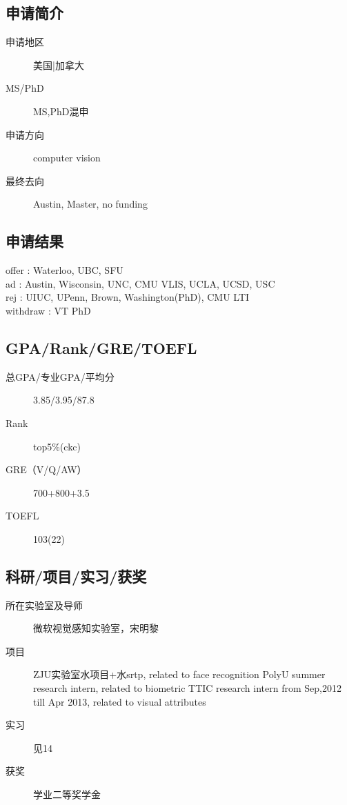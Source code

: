 \documentclass[11pt,fleqn,openany]{book} %
\begin{document}
\noindent\begin{minipage}[t]{0.45\textwidth}
\subsection*{申请简介}
\begin{description}
\item[申请地区] 美国|加拿大
\item[MS/PhD] MS,PhD混申
\item[申请方向] computer vision
\item[最终去向] Austin, Master, no funding
\end{description}
\end{minipage}
\hfill
\begin{minipage}[t]{0.45\textwidth}
\subsection*{申请结果}
\noindent offer : Waterloo, UBC, SFU\\
ad : Austin, Wisconsin, UNC, CMU VLIS, UCLA, UCSD, USC\\
rej : UIUC, UPenn, Brown, Washington(PhD), CMU LTI\\
withdraw : VT PhD
\end{minipage}
\subsection*{GPA/Rank/GRE/TOEFL}
\begin{description}
\item[总GPA/专业GPA/平均分] 3.85/3.95/87.8
\item[Rank] top5\%(ckc)
\item[GRE（V/Q/AW）] 700+800+3.5
\item[TOEFL] 103(22)
\end{description}

\subsection*{科研/项目/实习/获奖}
\begin{description}
\item[所在实验室及导师] 微软视觉感知实验室，宋明黎
\item[项目] ZJU实验室水项目+水srtp, related to face recognition
PolyU summer research intern, related to biometric
TTIC research intern from Sep,2012 till Apr 2013, related to visual attributes
\item[实习] 见14
\item[获奖] 学业二等奖学金
\end{description}
\end{document}
